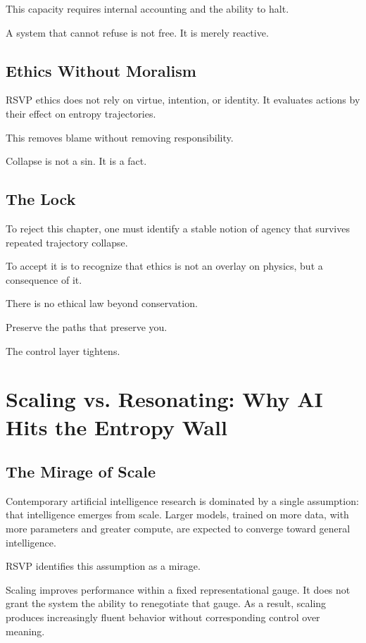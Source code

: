 \documentclass[11pt]{book}
\begin{document}
This capacity requires internal accounting and the ability to halt.

A system that cannot refuse is not free. It is merely reactive.

\section{Ethics Without Moralism}

RSVP ethics does not rely on virtue, intention, or identity. It evaluates actions by their effect on entropy trajectories.

This removes blame without removing responsibility.

Collapse is not a sin. It is a fact.

\section{The Lock}

To reject this chapter, one must identify a stable notion of agency that survives repeated trajectory collapse.

To accept it is to recognize that ethics is not an overlay on physics, but a consequence of it.

There is no ethical law beyond conservation.

Preserve the paths that preserve you.

The control layer tightens.


\chapter{Scaling vs. Resonating: Why AI Hits the Entropy Wall}

\section{The Mirage of Scale}

Contemporary artificial intelligence research is dominated by a single assumption: that intelligence emerges from scale. Larger models, trained on more data, with more parameters and greater compute, are expected to converge toward general intelligence.

RSVP identifies this assumption as a mirage.

Scaling improves performance within a fixed representational gauge. It does not grant the system the ability to renegotiate that gauge. As a result, scaling produces increasingly fluent behavior without corresponding control over meaning.
\end{document}
